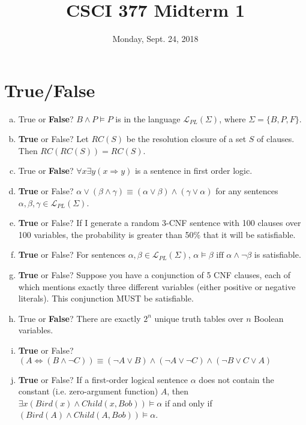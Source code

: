 \documentclass{article}
\title{CSCI 377 Midterm 1}
\date{Monday, Sept. 24, 2018}
\begin{document}
\maketitle

\section{True/False}



\begin{enumerate}[(a)]
\item True or \textbf{False}? $B \land P \models P$ is in the language $\mathcal{L}_{PL}(\Sigma)$, where $\Sigma = \{B, P, F\}$. 
\item \textbf{True} or False? Let $RC(S)$ be the resolution closure of a set $S$ of clauses. Then $RC(RC(S)) = RC(S)$. 
\item True or \textbf{False}? $\forall x \exists y  (x \Rightarrow y)$ is a sentence in first order logic.
\item \textbf{True} or False? $\alpha \lor (\beta \land \gamma) \equiv (\alpha \lor \beta) \land (\gamma \lor \alpha)$ for any sentences $\alpha, \beta, \gamma \in \mathcal{L}_{PL}(\Sigma)$.
\item \textbf{True} or False? If I generate a random 3-CNF sentence with 100 clauses over 100 variables, the probability is greater than 50\% that it will be satisfiable.
\item \textbf{True} or False? For sentences $\alpha, \beta \in \mathcal{L}_{PL}(\Sigma)$, $\alpha \models \beta \mbox{ iff } \alpha \land \lnot \beta$ is satisfiable.
\item \textbf{True} or False? Suppose you have a conjunction of 5 CNF clauses, each of which mentions exactly three different variables (either positive or negative literals). This conjunction MUST be satisfiable.
\item True or \textbf{False}? There are exactly $2^n$ unique truth tables over $n$ Boolean variables.
\item \textbf{True} or False? $(A \Leftrightarrow (B \land \lnot C)) \equiv (\lnot A \lor B) \land (\lnot A \lor \lnot C) \land (\lnot B \lor C \lor A)$
\item \textbf{True} or False? If a first-order logical sentence $\alpha $ does not contain the constant (i.e. zero-argument function) $A$, then $\exists x (Bird(x) \land Child(x, Bob)) \models \alpha $ if and only if $(Bird(A) \land Child(A, Bob)) \models \alpha$.
\end{enumerate}
\end{document}
